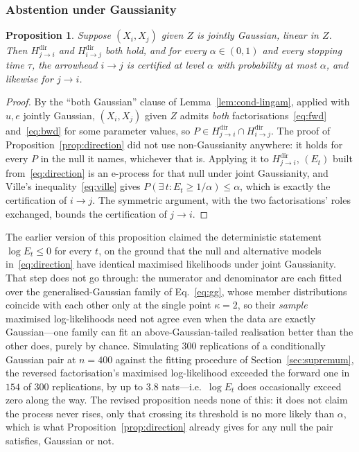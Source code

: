 \documentclass[pdflatex,sn-apa]{sn-jnl}
\theoremstyle{thmstyleone}%
\newtheorem{proposition}[theorem]{Proposition}%
\theoremstyle{thmstyletwo}%
\theoremstyle{thmstylethree}%
\begin{document}
\subsubsection{Abstention under Gaussianity}\label{sec:abstention}

\begin{proposition}\label{prop:abstain}
Suppose $(X_i, X_j)$ given $Z$ is jointly Gaussian, linear in $Z$. Then
$H^{\mathrm{dir}}_{j \to i}$ and $H^{\mathrm{dir}}_{i \to j}$ both hold, and
for every $\alpha \in (0,1)$ and every stopping time $\tau$, the arrowhead
$i \to j$ is certified at level $\alpha$ with probability at most $\alpha$,
and likewise for $j \to i$.
\end{proposition}

\begin{proof}
By the ``both Gaussian'' clause of Lemma~\ref{lem:cond-lingam}, applied with
$u, e$ jointly Gaussian, $(X_i, X_j)$ given $Z$ admits \emph{both}
factorisations~\eqref{eq:fwd} and~\eqref{eq:bwd} for some parameter values, so
$P \in H^{\mathrm{dir}}_{j \to i} \cap H^{\mathrm{dir}}_{i \to j}$. The proof
of Proposition~\ref{prop:direction} did not use non-Gaussianity anywhere: it
holds for every $P$ in the null it names, whichever that is. Applying it to
$H^{\mathrm{dir}}_{j \to i}$, $(E_t)$ built from~\eqref{eq:direction} is an
e-process for that null under joint Gaussianity, and Ville's
inequality~\eqref{eq:ville} gives $P(\exists\, t : E_t \ge 1/\alpha) \le \alpha$,
which is exactly the certification of $i \to j$. The symmetric argument, with
the two factorisations' roles exchanged, bounds the certification of
$j \to i$.
\end{proof}

The earlier version of this proposition claimed the deterministic statement
$\log E_t \le 0$ for every $t$, on the ground that the null and alternative
models in~\eqref{eq:direction} have identical maximised likelihoods under joint
Gaussianity. That step does not go through: the numerator and denominator are
each fitted over the generalised-Gaussian family of Eq.~\eqref{eq:gg}, whose
member distributions coincide with each other only at the single point
$\kappa = 2$, so their \emph{sample} maximised log-likelihoods need not agree
even when the data are exactly Gaussian---one family can fit an
above-Gaussian-tailed realisation better than the other does, purely by
chance. Simulating $300$ replications of a conditionally Gaussian pair at
$n = 400$ against the fitting procedure of Section~\ref{sec:supremum}, the
reversed factorisation's maximised log-likelihood exceeded the forward one in
$154$ of $300$ replications, by up to $3.8$ nats---i.e.\ $\log E_t$ does
occasionally exceed zero along the way. The revised proposition needs none of
this: it does not claim the process never rises, only that crossing its
threshold is no more likely than $\alpha$, which is what
Proposition~\ref{prop:direction} already gives for any null the pair
satisfies, Gaussian or not.
\end{document}
